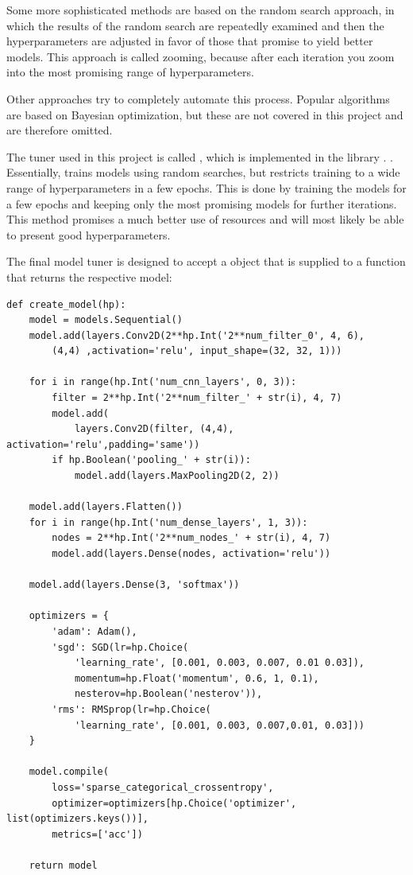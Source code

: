 Some more sophisticated methods are based on the random search approach, in which the results of the random search are repeatedly examined and then the hyperparameters are adjusted in favor of those that promise to yield better models.
This approach is called zooming, because after each iteration you zoom into the most promising range of hyperparameters.

Other approaches try to completely automate this process.
Popular algorithms are based on Bayesian optimization, but these are not covered in this project and are therefore omitted.

The tuner used in this project is called  \cite{Li2018}, which is implemented in the library . \cite{Google2019a}.
Essentially,  trains models using random searches, but restricts training to a wide range of hyperparameters in a few epochs.
This is done by training the models for a few epochs and keeping only the most promising models for further iterations.
This method promises a much better use of resources and will most likely be able to present good hyperparameters.

The final model tuner is designed to accept a  object that is supplied to a function that returns the respective model:

\begin{lstlisting}[caption={Function to find optimized model.}]
def create_model(hp):
    model = models.Sequential()
    model.add(layers.Conv2D(2**hp.Int('2**num_filter_0', 4, 6),
        (4,4) ,activation='relu', input_shape=(32, 32, 1)))

    for i in range(hp.Int('num_cnn_layers', 0, 3)):
        filter = 2**hp.Int('2**num_filter_' + str(i), 4, 7)
        model.add(
            layers.Conv2D(filter, (4,4), activation='relu',padding='same'))
        if hp.Boolean('pooling_' + str(i)):
            model.add(layers.MaxPooling2D(2, 2))

    model.add(layers.Flatten())
    for i in range(hp.Int('num_dense_layers', 1, 3)):
        nodes = 2**hp.Int('2**num_nodes_' + str(i), 4, 7)
        model.add(layers.Dense(nodes, activation='relu'))
    
    model.add(layers.Dense(3, 'softmax'))

    optimizers = {
        'adam': Adam(),
        'sgd': SGD(lr=hp.Choice(
            'learning_rate', [0.001, 0.003, 0.007, 0.01 0.03]),
            momentum=hp.Float('momentum', 0.6, 1, 0.1),
            nesterov=hp.Boolean('nesterov')),
        'rms': RMSprop(lr=hp.Choice(
            'learning_rate', [0.001, 0.003, 0.007,0.01, 0.03]))
    }

    model.compile(
        loss='sparse_categorical_crossentropy',
        optimizer=optimizers[hp.Choice('optimizer', list(optimizers.keys())],
        metrics=['acc'])

    return model
\end{lstlisting}

